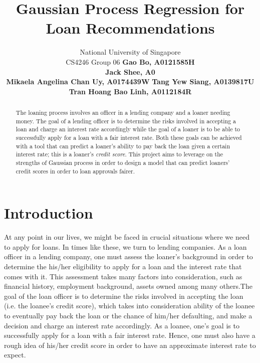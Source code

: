 \documentclass[a4paper]{article}
\theoremstyle{genius}
\begin{document}
%
\title{Gaussian Process Regression for Loan Recommendations}
\author{
National University of Singapore \\
CS4246 Group 06 \AND
\normalsize\normalfont\textbf{Gao Bo, A0121585H} \\ 
\normalsize\normalfont\textbf{Jack Shee, A0} \\
\normalsize\normalfont\textbf{Mikaela Angelina Chan Uy, A0174439W} \And
\normalsize\normalfont\textbf{Tang Yew Siang, A0139817U} \\
\normalsize\normalfont\textbf{Tran Hoang Bao Linh, A0112184R}
}

\maketitle
\begin{abstract}
The loaning process involves an officer in a lending company and a loaner needing money. The goal of a lending officer is to determine the risks involved in accepting a loan and charge an interest rate accordingly while the goal of a loaner is to be able to successfully apply for a loan with a fair interest rate. Both these goals can be achieved with a tool that can predict a loaner's ability to pay back the loan given a certain interest rate; this is a loaner's \textit{credit score}. This project aims to leverage on the strengths of Gaussian process in order to design a model that can predict loaners' credit scores in order to loan approvals fairer.
\end{abstract}

\section{Introduction}
\noindent 
At any point in our lives, we might be faced in crucial situations where we need to apply for loans. In times like these, we turn to lending companies. As a loan officer in a lending company, one must assess the loaner's background in order to determine the his/her eligibility to apply for a loan and the interest rate that comes with it. This assessment takes many factors into consideration, such as financial history, employment background, assets owned among many others.The goal of the loan officer is to determine the risks involved in accepting the loan (i.e. the loanee's credit score), which takes into consideration ability of the loanee to eventually pay back the loan or the chance of him/her defaulting, and make a decision and charge an interest rate accordingly. As a loanee, one's goal is to successfully apply for a loan with a fair interest rate. Hence, one must also have a rough idea of his/her credit score in order to have an approximate interest rate to expect. 
\end{document}
